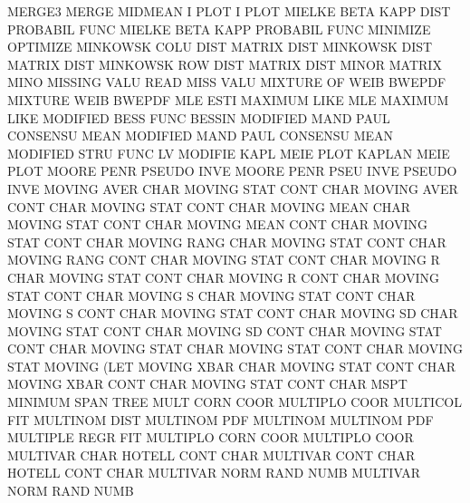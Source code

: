 MERGE3                                  MERGE
MIDMEAN  I    PLOT                      I        PLOT
MIELKE   BETA KAPP DIST                 PROBABIL FUNC
MIELKE   BETA KAPP                      PROBABIL FUNC
MINIMIZE                                OPTIMIZE
MINKOWSK COLU DIST                      MATRIX   DIST
MINKOWSK DIST                           MATRIX   DIST
MINKOWSK ROW  DIST                      MATRIX   DIST
MINOR                                   MATRIX   MINO
MISSING  VALU                           READ     MISS VALU 
MIXTURE  OF   WEIB                      BWEPDF
MIXTURE  WEIB                           BWEPDF
MLE      ESTI                           MAXIMUM  LIKE
MLE                                     MAXIMUM  LIKE
MODIFIED BESS FUNC                      BESSIN
MODIFIED MAND PAUL                      CONSENSU MEAN
MODIFIED MAND PAUL                      CONSENSU MEAN
MODIFIED STRU FUNC                      LV
MODIFIE  KAPL MEIE PLOT                 KAPLAN   MEIE PLOT
MOORE    PENR                           PSEUDO   INVE
MOORE    PENR PSEU INVE                 PSEUDO   INVE
MOVING   AVER CHAR                      MOVING   STAT CONT CHAR
MOVING   AVER CONT CHAR                 MOVING   STAT CONT CHAR
MOVING   MEAN CHAR                      MOVING   STAT CONT CHAR
MOVING   MEAN CONT CHAR                 MOVING   STAT CONT CHAR
MOVING   RANG CHAR                      MOVING   STAT CONT CHAR
MOVING   RANG CONT CHAR                 MOVING   STAT CONT CHAR
MOVING   R    CHAR                      MOVING   STAT CONT CHAR
MOVING   R    CONT CHAR                 MOVING   STAT CONT CHAR
MOVING   S    CHAR                      MOVING   STAT CONT CHAR
MOVING   S    CONT CHAR                 MOVING   STAT CONT CHAR
MOVING   SD   CHAR                      MOVING   STAT CONT CHAR
MOVING   SD   CONT CHAR                 MOVING   STAT CONT CHAR
MOVING   STAT CHAR                      MOVING   STAT CONT CHAR
MOVING   STAT                           MOVING   (LET
MOVING   XBAR CHAR                      MOVING   STAT CONT CHAR
MOVING   XBAR CONT CHAR                 MOVING   STAT CONT CHAR
MSPT                                    MINIMUM  SPAN TREE
MULT     CORN COOR                      MULTIPLO COOR
MULTICOL                                FIT
MULTINOM DIST                           MULTINOM PDF
MULTINOM                                MULTINOM PDF
MULTIPLE REGR                           FIT
MULTIPLO CORN COOR                      MULTIPLO COOR
MULTIVAR CHAR                           HOTELL   CONT CHAR
MULTIVAR CONT CHAR                      HOTELL   CONT CHAR
MULTIVAR NORM RAND NUMB                 MULTIVAR NORM RAND NUMB
